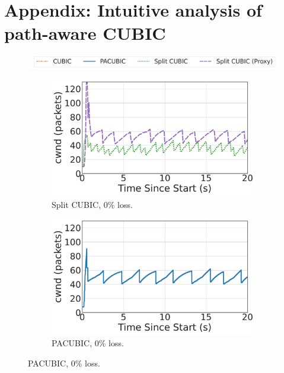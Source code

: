 \section{Appendix: Intuitive analysis of path-aware CUBIC}
\label{sec:sidekick:appendix}

\begin{figure}[ht]
\centering
\includegraphics[width=0.8\linewidth]{sidekick/figures/cwnd_legend.pdf}\\
\begin{subfigure}{0.32\linewidth}
  \includegraphics[width=\linewidth]{sidekick/figures/cwnd_split_loss0p.pdf}
  \caption{Split CUBIC, 0\% loss.}
  \label{fig:time-cwnd:split-loss0p}
\end{subfigure}
\begin{subfigure}{0.32\linewidth}
  \includegraphics[width=\linewidth]{sidekick/figures/cwnd_pacubic_loss0p.pdf}
  \caption{PACUBIC, 0\% loss.}
  \label{fig:time-cwnd:pacubic-loss0p}
\end{subfigure}

\end{figure}
